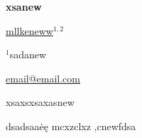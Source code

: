 \documentclass[12pt, twoside, a4paper, hidelinks]{article}
\begin{document}
\begin{center} \fontsize{14}{15}\selectfont \textbf{ xsanew } \end{center}
\vspace{-0.8cm}

\begin{center} \fontsize{12}{13}\selectfont \underline{mllkeneww}$^{1,2}$ \end{center}
\vspace{-.5cm}

\begin{center} \fontsize{10}{11}\selectfont $^{1}$sadanew
    
    \underline{email@email.com} \end{center}

\fontsize{10}{11}\selectfont
xsaxsxsaxasnew


dsadsaaėę
mcxzclxz ,cnewfdsa
\end{document}
